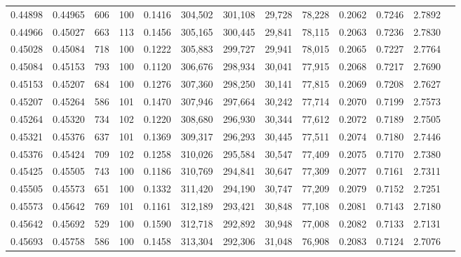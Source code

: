 \begin{tabular}{rrrrrrrrrrrrr}
0.44898 & 0.44965 &   606 & 100 &                                     0.1416 & 304,502 & 301,108 &  29,728 &  78,228 & 0.2062 & 0.7246 & 2.7892 \\
0.44966 & 0.45027 &   663 & 113 &                                     0.1456 & 305,165 & 300,445 &  29,841 &  78,115 & 0.2063 & 0.7236 & 2.7830 \\
0.45028 & 0.45084 &   718 & 100 &                                     0.1222 & 305,883 & 299,727 &  29,941 &  78,015 & 0.2065 & 0.7227 & 2.7764 \\
0.45084 & 0.45153 &   793 & 100 &                                     0.1120 & 306,676 & 298,934 &  30,041 &  77,915 & 0.2068 & 0.7217 & 2.7690 \\
0.45153 & 0.45207 &   684 & 100 &                                     0.1276 & 307,360 & 298,250 &  30,141 &  77,815 & 0.2069 & 0.7208 & 2.7627 \\
0.45207 & 0.45264 &   586 & 101 &                                     0.1470 & 307,946 & 297,664 &  30,242 &  77,714 & 0.2070 & 0.7199 & 2.7573 \\
0.45264 & 0.45320 &   734 & 102 &                                     0.1220 & 308,680 & 296,930 &  30,344 &  77,612 & 0.2072 & 0.7189 & 2.7505 \\
0.45321 & 0.45376 &   637 & 101 &                                     0.1369 & 309,317 & 296,293 &  30,445 &  77,511 & 0.2074 & 0.7180 & 2.7446 \\
0.45376 & 0.45424 &   709 & 102 &                                     0.1258 & 310,026 & 295,584 &  30,547 &  77,409 & 0.2075 & 0.7170 & 2.7380 \\
0.45425 & 0.45505 &   743 & 100 &                                     0.1186 & 310,769 & 294,841 &  30,647 &  77,309 & 0.2077 & 0.7161 & 2.7311 \\
0.45505 & 0.45573 &   651 & 100 &                                     0.1332 & 311,420 & 294,190 &  30,747 &  77,209 & 0.2079 & 0.7152 & 2.7251 \\
0.45573 & 0.45642 &   769 & 101 &                                     0.1161 & 312,189 & 293,421 &  30,848 &  77,108 & 0.2081 & 0.7143 & 2.7180 \\
0.45642 & 0.45692 &   529 & 100 &                                     0.1590 & 312,718 & 292,892 &  30,948 &  77,008 & 0.2082 & 0.7133 & 2.7131 \\
0.45693 & 0.45758 &   586 & 100 &                                     0.1458 & 313,304 & 292,306 &  31,048 &  76,908 & 0.2083 & 0.7124 & 2.7076 \\

\end{tabular}
